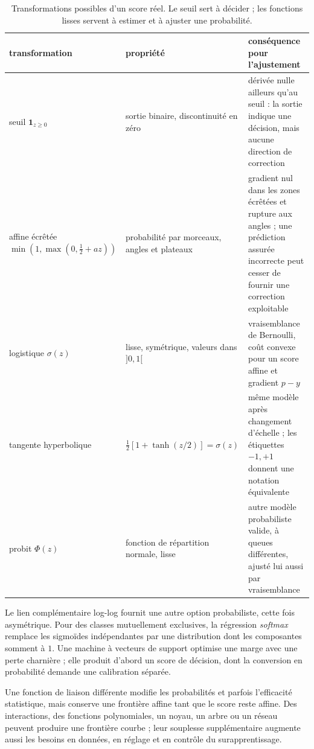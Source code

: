 \begin{table}[htbp]
\centering
\small
\begin{tabularx}{\textwidth}{
  >{\raggedright\arraybackslash}p{31mm}
  >{\raggedright\arraybackslash}p{40mm}
  >{\raggedright\arraybackslash}X}
\toprule
transformation & propriété & conséquence pour l'ajustement \\
\midrule
seuil $\mathbf{1}_{z\geq0}$ &
  sortie binaire, discontinuité en zéro &
  dérivée nulle ailleurs qu'au seuil : la sortie indique une décision, mais
  aucune direction de correction \\
affine écrêtée
  $\min(1,\max(0,\tfrac12+az))$ &
  probabilité par morceaux, angles et plateaux &
  gradient nul dans les zones écrêtées et rupture aux angles ; une prédiction
  assurée incorrecte peut cesser de fournir une correction exploitable \\
logistique $\sigma(z)$ &
  lisse, symétrique, valeurs dans $]0,1[$ &
  vraisemblance de Bernoulli, coût convexe pour un score affine et gradient
  $p-y$ \\
tangente hyperbolique &
  $\tfrac12[1+\tanh(z/2)]=\sigma(z)$ &
  même modèle après changement d'échelle ; les étiquettes $-1,+1$ donnent une
  notation équivalente \\
probit $\Phi(z)$ &
  fonction de répartition normale, lisse &
  autre modèle probabiliste valide, à queues différentes, ajusté lui aussi par
  vraisemblance \\
\bottomrule
\end{tabularx}
\caption{Transformations possibles d'un score réel. Le seuil sert à décider ;
les fonctions lisses servent à estimer et à ajuster une probabilité.}
\label{tab:liens}
\end{table}

Le lien complémentaire log-log fournit une autre option probabiliste, cette
fois asymétrique. Pour des classes mutuellement exclusives, la régression
\emph{softmax} remplace les sigmoïdes indépendantes par une distribution dont
les composantes somment à $1$. Une machine à vecteurs de support optimise une
marge avec une perte charnière ; elle produit d'abord un score de décision,
dont la conversion en probabilité demande une calibration séparée.

Une fonction de liaison différente modifie les probabilités et parfois
l'efficacité statistique, mais conserve une frontière affine tant que le score
reste affine. Des interactions, des fonctions polynomiales, un noyau, un arbre
ou un réseau peuvent produire une frontière courbe ; leur souplesse
supplémentaire augmente aussi les besoins en données, en réglage et en contrôle
du surapprentissage.

